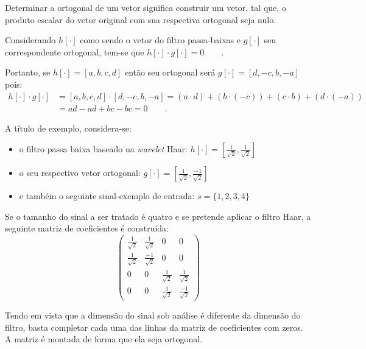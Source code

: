 			\par Determinar a ortogonal de um vetor significa construir um vetor, tal que, o produto escalar do vetor original com sua respectiva ortogonal seja nulo.
			
			\par Considerando $h[\cdot]$ como sendo o vetor do filtro passa-baixas e $g[\cdot]$ seu correspondente ortogonal, tem-se que $h[\cdot] \cdot g[\cdot] = 0 \qquad .$
			\par Portanto, se $h[\cdot]=[a, b, c, d]$ então seu ortogonal será $g[\cdot]=[d, -c, b, -a]$ pois:
			\begin{align*}
				h[\cdot] \cdot g[\cdot] &= [a, b, c, d] \cdot [d, -c, b, -a] = (a \cdot d) + (b \cdot (-c)) + (c \cdot b) + (d \cdot (-a)) \\
				&= ad - ad + bc - bc = 0 \qquad.
			\end{align*}
	
			\par A título de exemplo, considera-se:
			\begin{itemize}
				\item o filtro passa baixa baseado na \textit{wavelet} Haar: $h[\cdot] = [\frac{1}{\sqrt{2}}, \frac{1}{\sqrt{2}}]$
				\item o seu respectivo vetor ortogonal: $g[\cdot] = [\frac{1}{\sqrt{2}}, \frac{-1}{\sqrt{2}}]$
				\item e também o seguinte sinal-exemplo de entrada: $s = \{1,2,3,4\}$
			\end{itemize}
			
			\par Se o tamanho do sinal a ser tratado é quatro e se pretende aplicar o filtro Haar, a seguinte matriz de coeficientes é construída:
			\begin{equation}
				\begin{pmatrix}
					\frac{1}{\sqrt{2}} & \frac{1}{\sqrt{2}} & 0 & 0\\
					\frac{1}{\sqrt{2}} & \frac{-1}{\sqrt{2}} & 0 & 0\\
					0 & 0 & \frac{1}{\sqrt{2}} & \frac{1}{\sqrt{2}}\\
					0 & 0 & \frac{1}{\sqrt{2}} & \frac{-1}{\sqrt{2}}
				\end{pmatrix}
				\label{eq:haarFilters}
			\end{equation}
		
			\par Tendo em vista que a dimensão do sinal sob análise é diferente da dimensão do filtro, basta completar cada uma das linhas da matriz de coeficientes com zeros. A matriz é montada de forma que ela seja ortogonal.

